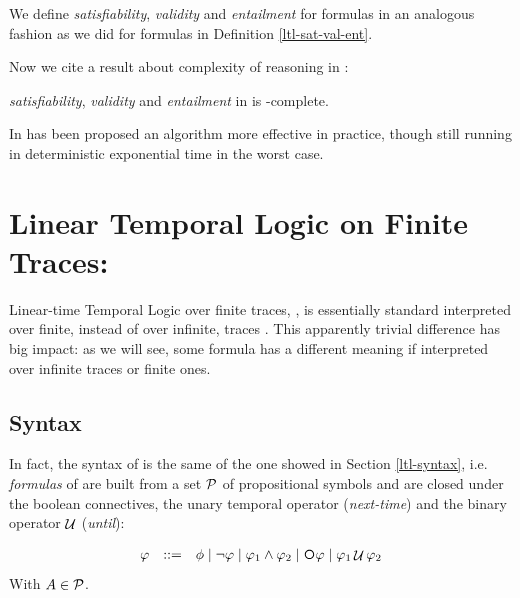 \begin{definition}
We define \emph{satisfiability}, \emph{validity} and \emph{entailment} for \PDL formulas in an analogous fashion as we did for \LTL formulas in Definition \ref{ltl-sat-val-ent}.
\end{definition}
Now we cite a result about complexity of reasoning in \PDL:

\begin{theorem}
	\emph{satisfiability}, \emph{validity} and \emph{entailment} in \PDL is \EXPTIME-complete.
\end{theorem}
In \citep{deGiacomo:2000:CDM:359243.359271} has been proposed an algorithm more effective in practice, though still running in deterministic exponential time in the worst case.

\section{Linear Temporal Logic on Finite Traces: \LTLf}
\label{ltlf}
Linear-time Temporal Logic over finite traces, \LTLf, is essentially standard 
\LTL \citep{Pnueli:1977:TLP:1382431.1382534} interpreted over finite, instead of over infinite, traces \citep{de2013linear}.
This apparently trivial difference has big impact: as we will see, some \LTL formula has a different meaning if interpreted over infinite traces or finite ones.

\subsection{Syntax}\label{ltlf-syntax}
In fact, the syntax of \LTLf is the same of the one showed in Section \ref{ltl-syntax}, i.e. \emph{formulas} of \LTLf are built from a set $\mathcal{P}$ of propositional symbols and are closed under the boolean connectives, the unary temporal operator \Next (\emph{next-time}) and the binary operator $\mathop{\mathcal{U}}$ (\emph{until}):

\[\begin{array}{rcl}
\varphi &::=& \phi \mid \lnot \varphi \mid \varphi_1\land \varphi_2 \mid \Next\varphi \mid \varphi_1 \lUntil \varphi_2
\end{array}
\]
With $A\in \mathcal{P}$.

